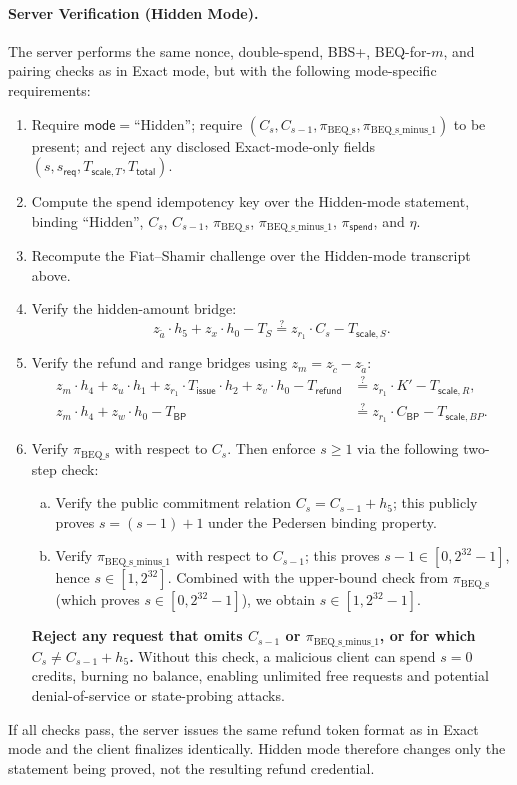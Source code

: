 \documentclass[11pt]{article}
\theoremstyle{definitionstyle}
\theoremstyle{plain}
\begin{document}
\paragraph{Server Verification (Hidden Mode).}
The server performs the same nonce, double-spend, BBS+, BEQ-for-$m$, and pairing checks as in Exact mode, but with the following mode-specific requirements:
\begin{enumerate}[leftmargin=*]
\item Require $\mathsf{mode} = \text{``Hidden''}$; require $(C_s, C_{s-1}, \pi_{\text{BEQ\_s}}, \pi_{\text{BEQ\_s\_minus\_1}})$ to be present; and reject any disclosed Exact-mode-only fields $(s, s_{\mathsf{req}}, T_{\mathsf{scale},T}, T_{\mathsf{total}})$.
\item Compute the spend idempotency key over the Hidden-mode statement, binding $\text{``Hidden''}$, $C_s$, $C_{s-1}$, $\pi_{\text{BEQ\_s}}$, $\pi_{\text{BEQ\_s\_minus\_1}}$, $\pi_{\mathsf{spend}}$, and $\eta$.
\item Recompute the Fiat--Shamir challenge over the Hidden-mode transcript above.
\item Verify the hidden-amount bridge:
  \[
  z_{\widetilde{a}} \cdot h_5 + z_x \cdot h_0 - T_S \stackrel{?}{=} z_{r_1} \cdot C_s - T_{\mathsf{scale},S}.
  \]
\item Verify the refund and range bridges using $z_m = z_{\tilde{c}} - z_{\widetilde{a}}$:
  \begin{align*}
    z_m \cdot h_4 + z_u \cdot h_1 + z_{r_1} \cdot T_{\mathsf{issue}} \cdot h_2 + z_v \cdot h_0 - T_{\mathsf{refund}} &\stackrel{?}{=} z_{r_1} \cdot K' - T_{\mathsf{scale},R}, \\
    z_m \cdot h_4 + z_w \cdot h_0 - T_{\mathsf{BP}} &\stackrel{?}{=} z_{r_1} \cdot C_{\mathsf{BP}} - T_{\mathsf{scale},BP}.
  \end{align*}
\item Verify $\pi_{\text{BEQ\_s}}$ with respect to $C_s$.  Then enforce $s \ge 1$ via the following two-step check:
  \begin{enumerate}[(a)]
  \item Verify the public commitment relation $C_s = C_{s-1} + h_5$; this publicly proves $s = (s-1)+1$ under the Pedersen binding property.
  \item Verify $\pi_{\text{BEQ\_s\_minus\_1}}$ with respect to $C_{s-1}$; this proves $s-1 \in [0, 2^{32}-1]$, hence $s \in [1, 2^{32}]$.  Combined with the upper-bound check from $\pi_{\text{BEQ\_s}}$ (which proves $s \in [0, 2^{32}-1]$), we obtain $s \in [1, 2^{32}-1]$.
  \end{enumerate}
  \textbf{Reject any request that omits $C_{s-1}$ or $\pi_{\text{BEQ\_s\_minus\_1}}$, or for which $C_s \neq C_{s-1} + h_5$.}  Without this check, a malicious client can spend $s=0$ credits, burning no balance, enabling unlimited free requests and potential denial-of-service or state-probing attacks.
\end{enumerate}
If all checks pass, the server issues the same refund token format as in Exact mode and the client finalizes identically. Hidden mode therefore changes only the statement being proved, not the resulting refund credential.
\end{document}
